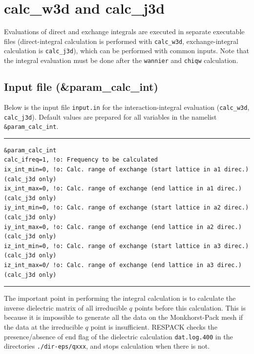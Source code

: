 \documentclass{article}
\begin{document}
\clearpage 

\section{calc\_w3d and calc\_j3d}
Evaluations of direct and exchange integrals are executed in separate executable files (direct-integral calculation is performed with {\tt calc\_w3d}, exchange-integral calculation is {\tt calc\_j3d}), which can be performed with common inputs. Note that the integral evaluation must be done after the {\tt wannier} and {\tt chiqw} calculation. 

\subsection{\label{input-calc-int}Input file (\&param\_calc\_int)}
Below is the input file \verb+input.in+ for the interaction-integral evaluation (\verb+calc_w3d+, \verb+calc_j3d+). Default values are prepared for all variables in the namelist \verb+&param_calc_int+.
\vspace{3mm}\hrule
\begin{verbatim}
&param_calc_int 
calc_ifreq=1, !o: Frequency to be calculated
ix_int_min=0, !o: Calc. range of exchange (start lattice in a1 direc.) (calc_j3d only)
ix_int_max=0, !o: Calc. range of exchange (end lattice in a1 direc.) (calc_j3d only)
iy_int_min=0, !o: Calc. range of exchange (start lattice in a2 direc.) (calc_j3d only)
iy_int_max=0, !o: Calc. range of exchange (end lattice in a2 direc.) (calc_j3d only)
iz_int_min=0, !o: Calc. range of exchange (start lattice in a3 direc.) (calc_j3d only)
iz_int_max=0/ !o: Calc. range of exchange (end lattice in a3 direc.) (calc_j3d only)
\end{verbatim}
\hrule\vspace{3mm}
The important point in performing the integral calculation is to calculate the inverse dielectric matrix of all irreducible $q$ points before this calculation. This is because it is impossible to generate all the data on the Monkhorst-Pack mesh if the data at the irreducible $q$ point is insufficient. RESPACK checks the presence/absence of end flag of the dielectric calculation \verb+dat.log.400+ in the directories  \verb+./dir-eps/qxxx+, and stops calculation when there is not.
\end{document}
